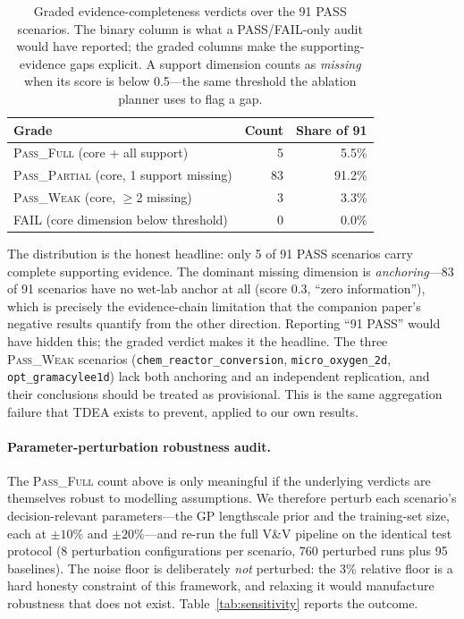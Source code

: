 \documentclass[review,3p]{elsarticle}
\begin{document}
\begin{table}[h]
    \centering
    \caption{Graded evidence-completeness verdicts over the 91 PASS scenarios.
    The binary column is what a PASS/FAIL-only audit would have reported; the
    graded columns make the supporting-evidence gaps explicit. A support
    dimension counts as \emph{missing} when its score is below 0.5---the same
    threshold the ablation planner uses to flag a gap.}
    \label{tab:graded}
    \begin{tabular}{l r r}
        \toprule
        Grade & Count & Share of 91 \\
        \midrule
        \textsc{Pass\_Full}    (core + all support)      & 5  & 5.5\% \\
        \textsc{Pass\_Partial} (core, 1 support missing) & 83 & 91.2\% \\
        \textsc{Pass\_Weak}    (core, $\geq$2 missing)   & 3  & 3.3\% \\
        \midrule
        FAIL (core dimension below threshold)            & 0  & 0.0\% \\
        \bottomrule
    \end{tabular}
\end{table}

The distribution is the honest headline: only 5 of 91 PASS scenarios carry complete supporting evidence. The dominant missing dimension is \emph{anchoring}---83 of 91 scenarios have no wet-lab anchor at all (score 0.3, ``zero information''), which is precisely the evidence-chain limitation that the companion paper's negative results quantify from the other direction. Reporting ``91 PASS'' would have hidden this; the graded verdict makes it the headline. The three \textsc{Pass\_Weak} scenarios (\texttt{chem\_reactor\_conversion}, \texttt{micro\_oxygen\_2d}, \texttt{opt\_gramacylee1d}) lack both anchoring and an independent replication, and their conclusions should be treated as provisional. This is the same aggregation failure that TDEA exists to prevent, applied to our own results.

\paragraph{Parameter-perturbation robustness audit.}
The \textsc{Pass\_Full} count above is only meaningful if the underlying verdicts are themselves robust to modelling assumptions. We therefore perturb each scenario's decision-relevant parameters---the GP lengthscale prior and the training-set size, each at $\pm10\%$ and $\pm20\%$---and re-run the full V\&V pipeline on the identical test protocol (8 perturbation configurations per scenario, 760 perturbed runs plus 95 baselines). The noise floor is deliberately \emph{not} perturbed: the 3\% relative floor is a hard honesty constraint of this framework, and relaxing it would manufacture robustness that does not exist. Table~\ref{tab:sensitivity} reports the outcome.
\end{document}
